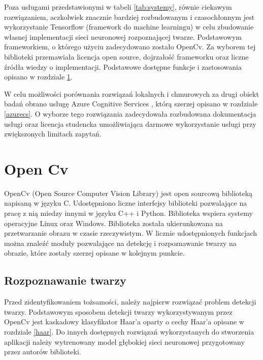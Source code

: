 Poza usługami przedstawionymi w tabeli \ref{tab:systemy}, równie ciekawym rozwiązaniem, aczkolwiek znacznie bardziej rozbudowanym i czasochłonnym jest wykorzystanie Tensorflow \cite{tensorflow} (framework do machine learningu) w celu zbudowanie własnej implementacji sieci neuronowej rozpoznającej twarze.
Podstawowym frameworkiem, o którego użyciu zadecydowano zostało OpenCv. Za wyborem tej biblioteki przemawiała licencja open source, dojrzałość frameworku oraz liczne źródła wiedzy o implementacji. Podstawowe dostępne funkcje i zastosowania opisano w rozdziale \ref{s:open_cv}.

W celu możliwości porównania rozwiązań lokalnych i chmurowych za drugi obiekt badań obrano usługę Azure Cognitive Services \cite{acs_doc}, którą szerzej opisano w rozdziale \ref{azurecs}. O wyborze tego rozwiązania zadecydowała rozbudowana dokumentacja usługi oraz licencja studencka umożliwiająca darmowe wykorzystanie usługi przy zwiększonych limitach zapytań.

\section{Open Cv} \label{s:open_cv}
OpenCv (Open Source Computer Vision Library) jest open sourcową biblioteką napisaną w języku C. Udostępniono liczne interfejsy biblioteki pozwalające na pracę z nią miedzy innymi w języku C++ i Python. Biblioteka wspiera systemy operacyjne Linux oraz Windows. Biblioteka została ukierunkowana na przetwarzanie obrazu w czasie rzeczywistym. W licznie udostępnionych funkcjach można znaleźć moduły pozwalające na detekcję i rozpoznawanie twarzy na obrazie, które zostały szerzej opisane w kolejnym punkcie.

\subsection{Rozpoznawanie twarzy}
Przed zidentyfikowaniem tożsamości, należy najpierw rozwiązać problem detekcji twarzy. Podstawowym sposobem detekcji twarzy wykorzystywanym przez OpenCv jest kaskadowy klasyfikator Haar'a oparty o cechy Haar'a opisane w rozdziale \ref{haar}. Do innych dostępnych rozwiązań wykorzystanych do stworzenia aplikacji należy wytrenowany model głębokiej sieci neuronowej przygotowany przez autorów biblioteki.

